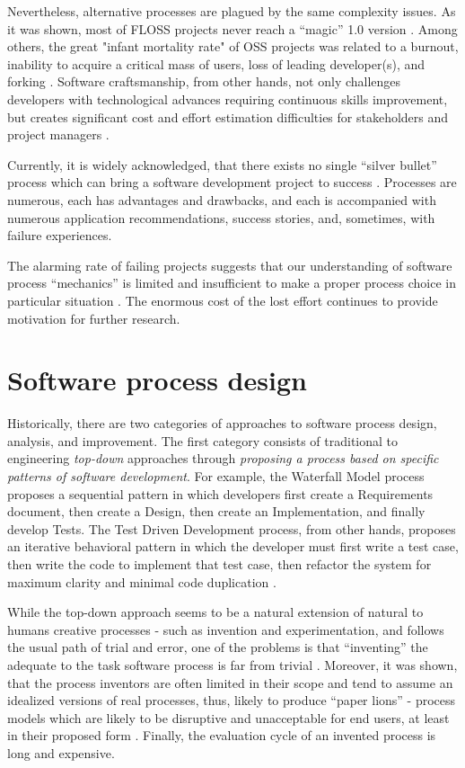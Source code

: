 Nevertheless, alternative processes are plagued by the same complexity issues. 
As it was shown, most of FLOSS projects never reach a ``magic'' 1.0 version \cite{citeulike:12480029}. 
Among others, the great "infant mortality rate" of OSS projects was related to a burnout, 
inability to acquire a critical mass of users, loss of leading developer(s), 
and forking \cite{richter2007critique}. 
Software craftsmanship, from other hands, not only challenges developers with technological advances 
requiring continuous skills improvement, but creates significant cost and effort estimation difficulties for
stakeholders and project managers \cite{citeulike:11058784}.

Currently, it is widely acknowledged, that there exists no single ``silver bullet'' process which can bring a 
software development project to success \cite{citeulike:1986013}. 
Processes are numerous, each has advantages and drawbacks, and each is accompanied with 
numerous application recommendations, success stories, and, sometimes, with failure experiences. 

The alarming rate of failing projects suggests that our understanding of software process ``mechanics''  
is limited and insufficient to make a proper process choice in particular situation \cite{citeulike:12550665}. 
The enormous cost of the lost effort continues to provide motivation for further research. 

\section{Software process design}\label{section_software_process}
Historically, there are two categories of approaches to software process design, analysis, and improvement. 
The first category consists of traditional to engineering \textit{top-down} approaches through \textit{proposing a
process based on specific patterns of software development}. 
For example, the Waterfall Model process proposes a sequential pattern in which developers first create a 
Requirements document, then create a Design, then create an Implementation, and finally develop Tests. 
The Test Driven Development process, from other hands, proposes an iterative behavioral pattern in which
the developer must first write a test case, then write the code to implement that test case, then refactor the 
system for maximum clarity and minimal code duplication \cite{citeulike:6086365}. 

While the top-down approach seems to be a natural extension of natural to humans creative processes - 
such as invention
and experimentation, and follows the usual path of trial and error, one of the problems is that ``inventing''
the adequate 
to the task software process is far from trivial \cite{citeulike:5043104} \cite{citeulike:1986013}. 
Moreover, it was shown, that the process inventors are often limited in their scope and tend to assume an idealized
versions of real processes, thus, likely to produce ``paper lions'' - process models which are likely to be
disruptive and unacceptable for end users, at least in their proposed form \cite{citeulike:9758924}. 
Finally, the evaluation cycle of an invented process is long and expensive. 

